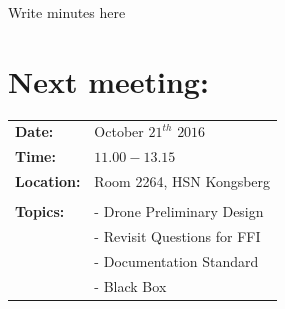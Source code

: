 \documentclass{article}
\begin{document}
Write minutes here

\section*{Next meeting:}   
\begin{tabular}{ll}                                              
\textbf{Date:} 	            & October $21^{th}$ $2016$	         \\
\textbf{Time:}		        & $11.00 - 13.15$				     \\
\textbf{Location:}	        & Room 2264, HSN Kongsberg	         \\\\
\textbf{Topics:}            & - Drone Preliminary Design         \\
				        	& - Revisit Questions for FFI        \\  
				        	& - Documentation Standard           \\
				        	& - Black Box                  	     \\
				        
				        	

\end{tabular}
\end{document}
